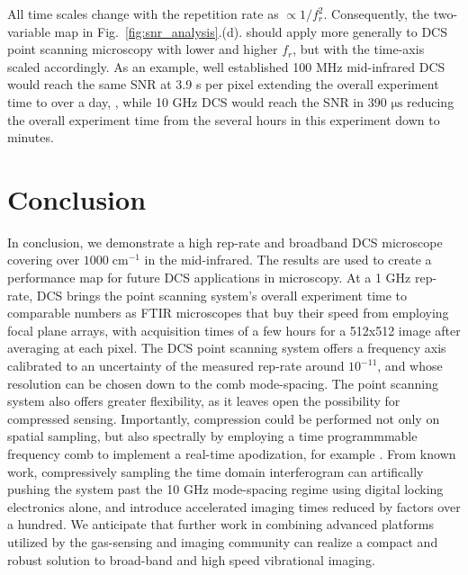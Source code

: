 \documentclass{optica-article}
\begin{document}
All time scales change with the repetition rate as $\propto 1 / f_r^2$. Consequently, the two-variable map in  \mbox{Fig. \ref{fig:snr_analysis}.(d).} should apply more generally to DCS point scanning microscopy with lower and higher $f_r$, but with the time-axis scaled accordingly. As an example, well established 100 MHz mid-infrared DCS \cite{lindMidInfraredFrequencyComb2020,timmersMolecularFingerprintingBright2018} would reach the same SNR at 3.9 s per pixel extending the overall experiment time to over a day, \cite{timmersHyperspectralMicroscopyBroadband2019}, while 10 GHz DCS would reach the SNR in 390 $\mathrm{\mu s}$ reducing the overall experiment time from the several hours in this experiment down to minutes.

\section{Conclusion}

In conclusion, we demonstrate a high rep-rate and broadband DCS microscope covering over $1000 \; \mathrm{cm^{-1}}$ in the mid-infrared. The results are used to create a performance map for future DCS applications in microscopy. At a 1 GHz rep-rate, DCS brings the point scanning system's overall experiment time to comparable numbers as FTIR microscopes that buy their speed from employing focal plane arrays, with acquisition times of a few hours for a 512x512 image after averaging at each pixel. The DCS point scanning system offers a frequency axis calibrated to an uncertainty of the measured rep-rate around $\mathrm{10^{-11}}$, and whose resolution can be chosen down to the comb mode-spacing. The point scanning system also offers greater flexibility, as it leaves open the possibility for compressed sensing. Importantly, compression could be performed not only on spatial sampling, but also spectrally by employing a time programmmable frequency comb to implement a real-time apodization, for example \cite{tourigny-planteApodizationDualcombSpectroscopy2020,kawaiCompressiveDualcombSpectroscopy2021,caldwellTimeprogrammableFrequencyComb2022}. From known work, compressively sampling the time domain interferogram can artifically pushing the system past the 10 GHz mode-spacing regime using digital locking electronics alone, and introduce accelerated imaging times reduced by factors over a hundred. We anticipate that further work in combining advanced platforms utilized by the gas-sensing and imaging community can realize a compact and robust solution to broad-band and high speed vibrational imaging. 



\end{document}
